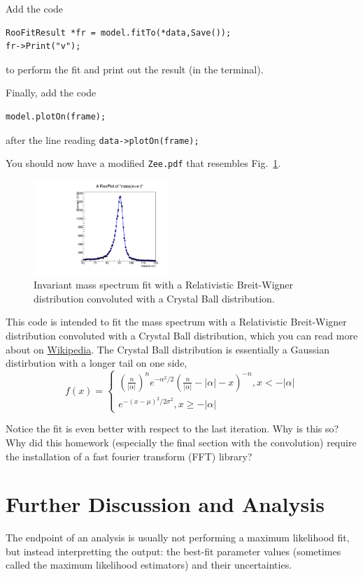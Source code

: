 \documentclass{article}
\begin{document}
Add the code 
\begin{verbatim}
RooFitResult *fr = model.fitTo(*data,Save());
fr->Print("v");  
\end{verbatim}
to perform the fit and print out the result (in the terminal).

Finally, add the code
\begin{verbatim}
model.plotOn(frame);
\end{verbatim}
after the line reading \texttt{data->plotOn(frame);}

You should now have a modified \texttt{Zee.pdf} that resembles Fig.~\ref{fig:Zee_conv}.
\begin{figure}
    \centering
    \includegraphics[width=2.0in]{Zee_conv.pdf}
    \caption{Invariant mass spectrum fit with a Relativistic Breit-Wigner distribution convoluted with a Crystal Ball distribution.}
    \label{fig:Zee_conv}
\end{figure} 

This code is intended to fit the mass spectrum with a Relativistic
Breit-Wigner distribution convoluted with a Crystal Ball distribution,
which you can read more about on
\href{http://en.wikipedia.org/wiki/Crystal_Ball_function}{Wikipedia}. The
Crystal Ball distribution is essentially a Gaussian distirbution with
a longer tail on one side,
\begin{equation}
f(x) = \left \{ \begin{array}{c}
 (\frac{n}{|\alpha|})^ne^{-\alpha^2/2} (\frac{n}{|\alpha|}-|\alpha|-x)^{-n}, x <-|\alpha|\\
 e^{-(x-\mu)^2/2\sigma^2}, x\geq-|\alpha|
\end{array} \right .
\end{equation}

Notice the fit is even better with respect to the last iteration. Why
is this so? Why did this homework (especially the final section with
the convolution) require the installation of a fast fourier transform (FFT) library?


\section{Further Discussion and Analysis}
The endpoint of an analysis is usually not performing a maximum
likelihood fit, but instead interpretting the output: the best-fit
parameter values (sometimes called the maximum likelihood estimators) and their uncertainties. 
\end{document}
